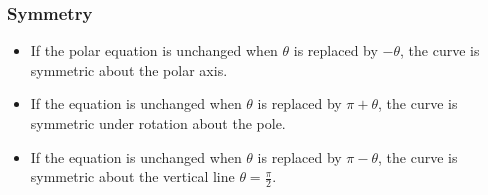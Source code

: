 \begin{frame}
\frametitle{Symmetry}
\begin{itemize}
\item<1-| alert@2>  If the polar equation is unchanged when $\theta$ is replaced by $-\theta$, the curve is symmetric about the polar axis.
\item<1-| alert@3>  If the equation is unchanged when $\theta$ is replaced by $\pi + \theta$, the curve is symmetric under rotation about the pole.
\item<1-| alert@4>  If the equation is unchanged when $\theta$ is replaced by $\pi - \theta$, the curve is symmetric about the vertical line $\theta = \frac{\pi}{2}$. 
\end{itemize}
\begin{center}
\ %
%
\end{center}
\end{frame}
